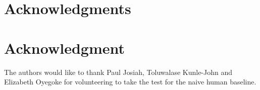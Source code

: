 \documentclass[conference]{IEEEtran}
\begin{document}



\small
\ifCLASSOPTIONcompsoc
  \section*{Acknowledgments}
\else
  \section*{Acknowledgment}
\fi

The authors would like to thank Paul Josiah, Toluwalase Kunle-John and Elizabeth Oyegoke for volunteering to take the test for the naive human baseline.







%
%
%




\end{document}
